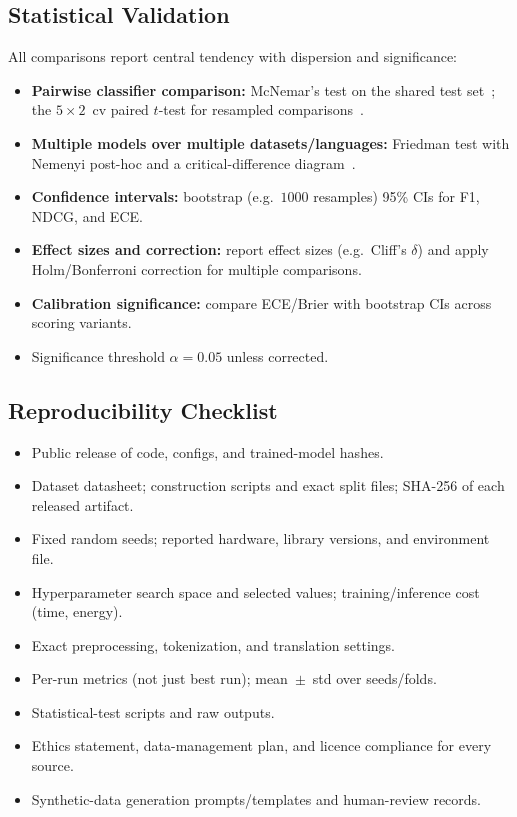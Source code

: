 \documentclass[11pt,a4paper]{article}
\begin{document}
\subsection{Statistical Validation}\label{sec:method-stats}
All comparisons report central tendency with dispersion and significance:
\begin{itemize}[leftmargin=1.5em,itemsep=1pt]
  \item \textbf{Pairwise classifier comparison:} McNemar's test on the shared test
  set~\cite{mcnemar1947note}; the $5\times2$~cv paired $t$-test for
  resampled comparisons~\cite{dietterich1998approximate}.
  \item \textbf{Multiple models over multiple datasets/languages:} Friedman test with
  Nemenyi post-hoc and a critical-difference diagram~\cite{demsar2006statistical}.
  \item \textbf{Confidence intervals:} bootstrap (e.g.\ $1000$ resamples) 95\% CIs for
  F1, NDCG, and ECE.
  \item \textbf{Effect sizes and correction:} report effect sizes (e.g.\ Cliff's
  $\delta$) and apply Holm/Bonferroni correction for multiple comparisons.
  \item \textbf{Calibration significance:} compare ECE/Brier with bootstrap CIs across
  scoring variants.
  \item Significance threshold $\alpha = 0.05$ unless corrected.
\end{itemize}

\subsection{Reproducibility Checklist}\label{sec:method-repro}
\begin{itemize}[leftmargin=1.5em,itemsep=1pt]
  \item[$\square$] Public release of code, configs, and trained-model hashes.
  \item[$\square$] Dataset datasheet; construction scripts and exact split files;
  SHA-256 of each released artifact.
  \item[$\square$] Fixed random seeds; reported hardware, library versions, and
  environment file.
  \item[$\square$] Hyperparameter search space and selected values; training/inference
  cost (time, energy).
  \item[$\square$] Exact preprocessing, tokenization, and translation settings.
  \item[$\square$] Per-run metrics (not just best run); mean~$\pm$~std over seeds/folds.
  \item[$\square$] Statistical-test scripts and raw outputs.
  \item[$\square$] Ethics statement, data-management plan, and licence compliance for
  every source.
  \item[$\square$] Synthetic-data generation prompts/templates and human-review records.
\end{itemize}
\end{document}
